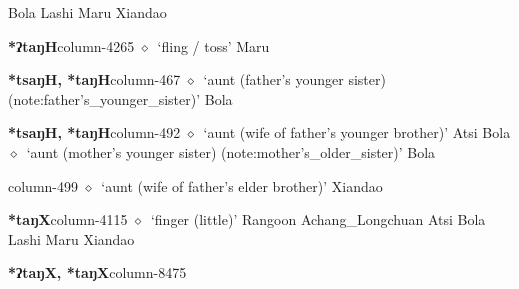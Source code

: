          Bola 
\hspace{1ex}
         Lashi 
\hspace{1ex}
         Maru 
\hspace{1ex}
         Xiandao 
  \item {\footnotesize \textbf{*ʔtaŋH}}{\tiny column-4265}
         $\diamond$~`fling / toss'
         Maru 
  \item {\footnotesize \textbf{*tsaŋH, *taŋH}}{\tiny column-467}
         $\diamond$~`aunt (father's younger sister) (note:father's_younger_sister)'
         Bola 
  \item {\footnotesize \textbf{*tsaŋH, *taŋH}}{\tiny column-492}
         $\diamond$~`aunt (wife of father's younger brother)'
         Atsi 
\hspace{1ex}
         Bola 
\hspace{1ex}
         $\diamond$~`aunt (mother's younger sister) (note:mother's_older_sister)'
         Bola 
  \item {\footnotesize \textbf{}}{\tiny column-499}
         $\diamond$~`aunt (wife of father's elder brother)'
         Xiandao 
  \item {\footnotesize \textbf{*taŋX}}{\tiny column-4115}
         $\diamond$~`finger (little)'
         Rangoon 
\hspace{1ex}
         Achang\_Longchuan 
\hspace{1ex}
         Atsi 
\hspace{1ex}
         Bola 
\hspace{1ex}
         Lashi 
\hspace{1ex}
         Maru 
\hspace{1ex}
         Xiandao 
  \item {\footnotesize \textbf{*ʔtaŋX, *taŋX}}{\tiny column-8475}
